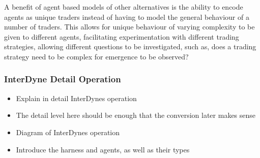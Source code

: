 \documentclass{article}
\begin{document}
A benefit of agent based models of other alternatives is the ability to encode agents as unique traders instead of having to model the general behaviour of a number of traders. This allows for unique behaviour of varying complexity to be given to different agents, facilitating experimentation with different trading strategies, allowing different questions to be investigated, such as, does a trading strategy need to be complex for emergence to be observed? 




\subsubsection{InterDyne Detail Operation}

\begin{itemize}
  \item Explain in detail InterDynes operation
  \item The detail level here should be enough that the conversion later makes sense 
  \item Diagram of InterDynes operation 
  \item Introduce the harness and agents, as well as their types 
\end{itemize}
\end{document}
